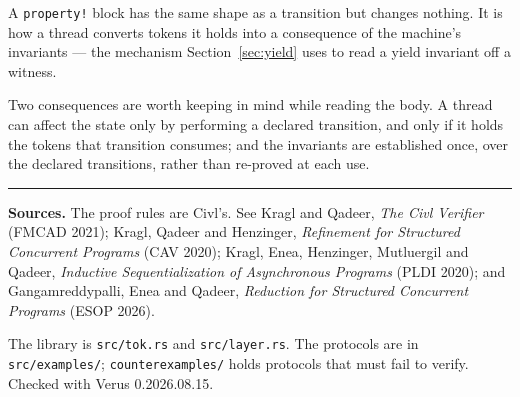 \documentclass[11pt]{article}
\newcommand{\code}[1]{\texttt{#1}}
\begin{document}
A \code{property!} block has the same shape as a transition but changes nothing.
It is how a thread converts tokens it holds into a consequence of the machine's
invariants --- the mechanism Section~\ref{sec:yield} uses to read a yield
invariant off a witness.

Two consequences are worth keeping in mind while reading the body. A thread can
affect the state only by performing a declared transition, and only if it holds
the tokens that transition consumes; and the invariants are established once,
over the declared transitions, rather than re-proved at each use.

\vspace{1.5em}
\noindent\textcolor{rulegrey}{\rule{\linewidth}{0.4pt}}
\vspace{0.4em}

{\small\color{comment}
\noindent\textbf{Sources.} The proof rules are Civl's. See Kragl and Qadeer,
\emph{The Civl Verifier} (FMCAD 2021); Kragl, Qadeer and Henzinger,
\emph{Refinement for Structured Concurrent Programs} (CAV 2020); Kragl, Enea,
Henzinger, Mutluergil and Qadeer, \emph{Inductive Sequentialization of
Asynchronous Programs} (PLDI 2020); and Gangamreddypalli, Enea and Qadeer,
\emph{Reduction for Structured Concurrent Programs} (ESOP 2026).

\vspace{0.4em}
\noindent The library is \code{src/tok.rs} and \code{src/layer.rs}. The
protocols are in \code{src/examples/}; \code{counterexamples/} holds protocols
that must fail to verify. Checked with Verus 0.2026.08.15.
}
\end{document}
